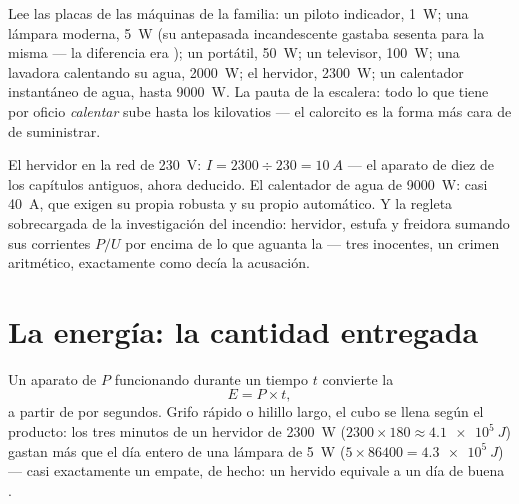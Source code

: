 \begin{example}\label{ex:g9:electric-power-energy:ladder}
Lee las placas de las máquinas de la familia: un piloto indicador,
\qty{1}{W}; una lámpara moderna, \qty{5}{W} (su antepasada
incandescente gastaba sesenta para la misma  --- la diferencia
era ); un portátil, \qty{50}{W}; un televisor,
\qty{100}{W}; una lavadora calentando su agua, \qty{2000}{W}; el
hervidor, \qty{2300}{W}; un calentador instantáneo de agua, hasta
\qty{9000}{W}. La pauta de la escalera: todo lo que tiene por oficio
\emph{calentar} sube hasta los kilovatios --- el calorcito es la forma
más cara de  de suministrar.
\end{example}

\begin{example}\label{ex:g9:electric-power-energy:fuses}
El hervidor en la red de \qty{230}{V}: $I = 2300 \div 230 =
\qty{10}{A}$ --- el aparato de diez  de los capítulos
antiguos, ahora deducido. El calentador de agua de \qty{9000}{W}: casi
\qty{40}{A}, que exigen su propia  robusta y su propio
automático. Y la regleta sobrecargada de la investigación del incendio:
hervidor, estufa y freidora sumando sus corrientes $P/U$ por encima de
lo que aguanta la  --- tres inocentes, un crimen aritmético,
exactamente como decía la acusación.
\end{example}

\section{La energía: la cantidad entregada}

\begin{proposition}\label{prop:g9:electric-power-energy:Pt}
Un aparato de  $P$ funcionando durante un tiempo $t$
convierte la 
\[
E = P \times t ,
\]
 a partir de  por segundos. Grifo rápido o
hilillo largo, el cubo se llena según el producto: los tres minutos de
un hervidor de \qty{2300}{W} ($2300 \times 180 \approx
\qty{4.1e5}{J}$) gastan más que el día entero de una lámpara de
\qty{5}{W} ($5 \times 86400 = \qty{4.3e5}{J}$) --- casi exactamente un
empate, de hecho: un hervido equivale a un día de buena
.
\end{proposition}

